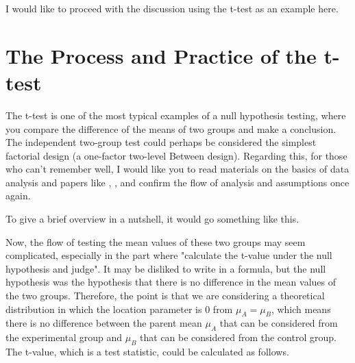 \documentclass{ltjsbook}
\begin{document}
I would like to proceed with the discussion using the t-test as an example here.
\section{The Process and Practice of the t-test}
The t-test is one of the most typical examples of a null hypothesis testing, where you compare the difference of the means of two groups and make a conclusion.
The independent two-group test could perhaps be considered the simplest factorial design (a one-factor two-level Between design).
Regarding this, for those who can't remember well, I would like you to read materials on the basics of data analysis and papers like \textcite{Yamada2004}, \textcite{Shimizu2021}, and confirm the flow of analysis and assumptions once again.

To give a brief overview in a nutshell, it would go something like this.


Now, the flow of testing the mean values of these two groups may seem complicated, especially in the part where "calculate the t-value under the null hypothesis and judge". It may be disliked to write in a formula, but the null hypothesis was the hypothesis that there is no difference in the mean values of the two groups. Therefore, the point is that we are considering a theoretical distribution in which the location parameter is $0$ from $\mu_A=\mu_B$, which means there is no difference between the parent mean $\mu_A$ that can be considered from the experimental group and $\mu_B$ that can be considered from the control group. The t-value, which is a test statistic, could be calculated as follows.
\end{document}
